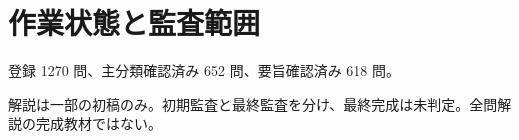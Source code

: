 \chapter{作業状態と監査範囲}
登録 1270 問、主分類確認済み 652 問、要旨確認済み 618 問。
\par 解説は一部の初稿のみ。初期監査と最終監査を分け、最終完成は未判定。全問解説の完成教材ではない。

